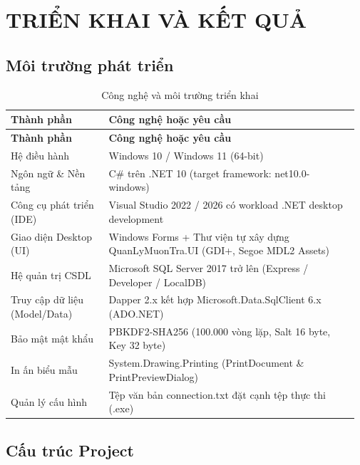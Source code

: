 \chapter{TRIỂN KHAI VÀ KẾT QUẢ}

\section{Môi trường phát triển}

{\small\setlength{\tabcolsep}{3pt}\renewcommand{\arraystretch}{1.25}
\begin{longtable}{|>{\raggedright\arraybackslash}p{0.277\linewidth}|>{\raggedright\arraybackslash}p{0.693\linewidth}|}
\caption{Công nghệ và môi trường triển khai}\\
\hline
\rowcolor{gray!25}\textbf{\textbf{Thành phần}} & \textbf{\textbf{Công nghệ hoặc yêu cầu}} \\ \hline
\endfirsthead
\hline
\rowcolor{gray!25}\textbf{\textbf{Thành phần}} & \textbf{\textbf{Công nghệ hoặc yêu cầu}} \\ \hline
\endhead
\hline\endfoot
Hệ điều hành & Windows 10 / Windows 11 (64-bit) \\ \hline
Ngôn ngữ \& Nền tảng & C\# trên .NET 10 (target framework: net10.0-windows) \\ \hline
Công cụ phát triển (IDE) & Visual Studio 2022 / 2026 có workload .NET desktop development \\ \hline
Giao diện Desktop (UI) & Windows Forms + Thư viện tự xây dựng QuanLyMuonTra.UI (GDI+, Segoe MDL2 Assets) \\ \hline
Hệ quản trị CSDL & Microsoft SQL Server 2017 trở lên (Express / Developer / LocalDB) \\ \hline
Truy cập dữ liệu (Model/Data) & Dapper 2.x kết hợp Microsoft.Data.SqlClient 6.x (ADO.NET) \\ \hline
Bảo mật mật khẩu & PBKDF2-SHA256 (100.000 vòng lặp, Salt 16 byte, Key 32 byte) \\ \hline
In ấn biểu mẫu & System.Drawing.Printing (PrintDocument \& PrintPreviewDialog) \\ \hline
Quản lý cấu hình & Tệp văn bản connection.txt đặt cạnh tệp thực thi (.exe) \\ \hline
\end{longtable}
}

\section{Cấu trúc Project}

